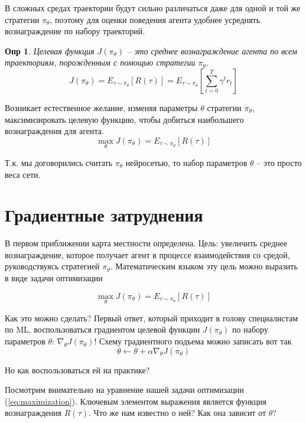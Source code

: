 \documentclass[a4paper,12pt]{article}
\newtheorem*{definition}{Опр}
\numberwithin{equation}{section}
\begin{document}
В сложных средах траектории будут сильно различаться даже для одной и той же стратегии $\pi_{\theta}$, поэтому для оценки поведения агента удобнее усреднять вознаграждение по набору траекторий. 

\begin{definition}
Целевая функция $J(\pi_{\theta})$ -- это среднее вознаграждение агента по всем траекториям, порожденным с помощью стратегии $\pi_{\theta}$.
\[
	J(\pi_{\theta}) = E_{\tau \sim \pi_{\theta}} \left[ R(\tau) \right] = E_{\tau \sim \pi_{\theta}} \left[ \sum_{t = 0}^{T} \gamma^{t} r_t \right]
\]
\end{definition}
 Возникает естественное желание, изменяя параметры $\theta$ стратегии  $\pi_{\theta}$,  максимизировать целевую функцию, чтобы добиться наибольшего вознаграждения для агента.
\[
	\max_{\theta} J(\pi_{\theta}) = E_{\tau \sim \pi_{\theta}} \left[ R(\tau) \right]
\]

Т.к. мы договорились считать $\pi_{\theta}$ нейросетью, то набор параметров $\theta$ -- это просто веса сети.


\section{Градиентные затруднения}

В первом приближении карта местности определена. Цель: увеличить среднее вознаграждение,  которое получает агент в процессе взаимодействия со средой, руководствуясь стратегией $\pi_{\theta}$. Математическим языком эту цель можно выразить в виде задачи оптимизации

\begin{equation} \label{eq:maximization}
		\max_{\theta} J(\pi_{\theta}) = E_{\tau \sim \pi_{\theta}} \left[ R(\tau) \right]
\end{equation}

Как это можно сделать? Первый ответ, который приходит в голову специалистам по ML, воспользоваться градиентом целевой функции $J(\pi_{\theta})$ по набору параметров $\theta$: $\nabla_\theta J(\pi_{\theta})$! Схему градиентного подъема можно записать вот так
\[
\theta \leftarrow \theta + \alpha \nabla_\theta J(\pi_{\theta})
\]

Но как воспользоваться ей на практике? 

Посмотрим внимательно на уравнение нашей задачи оптимизации (\ref{eq:maximization}). Ключевым элементом выражения является функция вознаграждения $R(\tau)$. Что же нам известно о ней? Как она зависит от $\theta$? 
\end{document}
